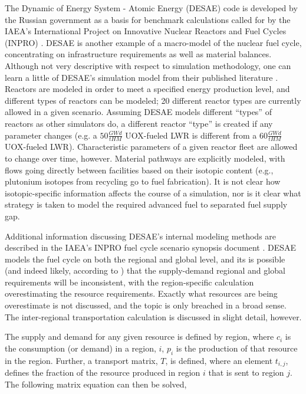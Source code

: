 The Dynamic of Energy System - Atomic Energy (DESAE) code is developed by the
Russian government as a basis for benchmark calculations called for by the
IAEA's International Project on Innovative Nuclear Reactors and Fuel Cycles
(INPRO) \cite{_international_2009,andrianova_desae_2008}. DESAE is another
example of a macro-model of the nuclear fuel cycle, concentrating on
infrastructure requirements as well as material balances. Although not very
descriptive with respect to simulation methodology, one can learn a little of
DESAE's simulation model from their published literature
\cite{andrianova_desae_2008}. Reactors are modeled in order to meet a specified
energy production level, and different types of reactors can be modeled; 20
different reactor types are currently allowed in a given scenario. Assuming
DESAE models different ``types'' of reactors as other simulators do, a different
reactor ``type'' is created if any parameter changes (e.g. a $50 \frac{GW
  d}{tHM}$ UOX-fueled LWR is different from a $60 \frac{GW d}{tHM}$ UOX-fueled
LWR). Characteristic parameters of a given reactor fleet are allowed to change
over time, however. Material pathways are explicitly modeled, with flows going
directly between facilities based on their isotopic content (e.g., plutonium
isotopes from recycling go to fuel fabrication). It is not clear how
isotopic-specific information affects the course of a simulation, nor is it
clear what strategy is taken to model the required advanced fuel to separated
fuel supply gap.

Additional information discussing DESAE's internal modeling methods are
described in the IAEA's INPRO fuel cycle scenario synopsis document
\cite{iaea_nuclear_2010}.  DESAE models the fuel cycle on both the regional and
global level, and its is possible (and indeed likely, according to
\cite{iaea_nuclear_2010}) that the supply-demand regional and global
requirements will be inconsistent, with the region-specific calculation
overestimating the resource requirements. Exactly what resources are being
overestimate is not discussed, and the topic is only breached in a broad
sense. The inter-regional transportation calculation is discussed in slight
detail, however. 

The supply and demand for any given resource is defined by region, where $c_i$
is the consumption (or demand) in a region, $i$, $p_i$ is the production of that
resource in the region. Further, a transport matrix, $T$, is defined, where an
element $t_{i,j}$, defines the fraction of the resource produced in region $i$
that is sent to region $j$. The following matrix equation can then be solved,

